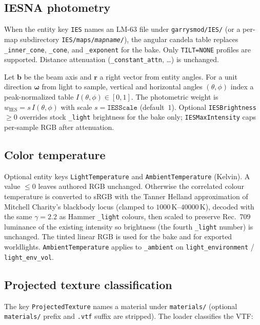\documentclass[11pt,a4paper]{article}
\newcommand{\ent}[1]{\texttt{#1}}
\newcommand{\code}[1]{\texttt{#1}}
\newcommand{\vect}[1]{\bm{#1}}
\begin{document}
\subsection{IESNA photometry}
\label{sec:ies}

When the entity key \code{IES} names an LM-63 file under \texttt{garrysmod/IES/}
(or a per-map subdirectory \texttt{IES/maps/\textit{mapname}/}), the angular candela table
replaces \code{\_inner\_cone}, \code{\_cone}, and \code{\_exponent} for the bake.
Only \texttt{TILT=NONE} profiles are supported. Distance attenuation
(\code{\_constant\_attn}, \ldots) is unchanged.

Let $\vect{b}$ be the beam axis and $\vect{r}$ a right vector from entity angles.
For a unit direction $\vect{\omega}$ from light to sample, vertical and horizontal
angles $(\theta,\phi)$ index a peak-normalized table $I(\theta,\phi)\in[0,1]$.
The photometric weight is $w_{\mathrm{IES}}=s\,I(\theta,\phi)$ with scale
$s=\texttt{IESScale}$ (default~$1$). Optional \code{IESBrightness}${}\ge 0$
overrides stock \code{\_light} brightness for the bake only;
\code{IESMaxIntensity} caps per-sample RGB after attenuation.

\subsection{Color temperature}
\label{sec:cct}

Optional entity keys \code{LightTemperature} and \code{AmbientTemperature}
(Kelvin). A value $\le 0$ leaves authored RGB unchanged. Otherwise the
correlated colour temperature is converted to sRGB with the Tanner Helland
approximation of Mitchell Charity's blackbody locus (clamped to
$1000\,\mathrm{K}$--$40000\,\mathrm{K}$), decoded with the same $\gamma=2.2$
as Hammer \code{\_light} colours, then scaled to preserve Rec.~709 luminance
of the existing intensity so brightness (the fourth \code{\_light} number)
is unchanged. The tinted linear RGB is used for the bake and for exported
worldlights. \code{AmbientTemperature} applies to \code{\_ambient} on
\ent{light\_environment} / \ent{light\_env\_vol}.

\subsection{Projected texture classification}
\label{sec:projtex}

The key \code{ProjectedTexture} names a material under \texttt{materials/}
(optional \texttt{materials/} prefix and \texttt{.vtf} suffix are stripped).
The loader classifies the VTF:
\end{document}
